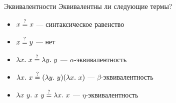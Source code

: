     \begin{frame}[fragile]{Эквивалентности}
        Эквивалентны ли следующие термы?
        \begin{itemize}
            \item[\todo] $x \stackrel{?}{=} x$ --- \pause синтаксическое равенство
            \item[\todo] $x \stackrel{?}{=} y$ --- \pause нет
            \item[\todo] $\lambda x. ~ x \stackrel{?}{=} \lambda y. ~ y$ --- \pause $\alpha$-эквивалентность
            \item[\todo] $\lambda x. ~ x \stackrel{?}{=} (\lambda y. ~ y) (\lambda x. ~ x)$ --- \pause $\beta$-эквивалентность
            \item[\todo] $\lambda x ~ y. ~ x ~ y \stackrel{?}{=} \lambda x. ~ x$ --- \pause $\eta$-эквивалентность
        \end{itemize}
    \end{frame}


